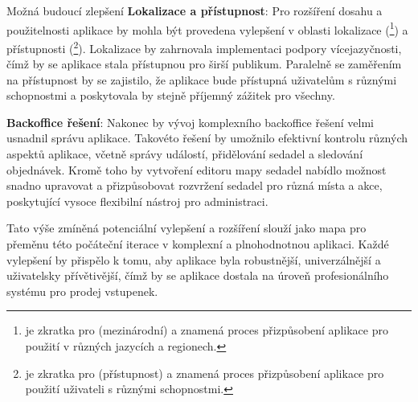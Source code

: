 \begin{section}{Možná budoucí zlepšení}
    \textbf{Lokalizace a přístupnost}: Pro rozšíření dosahu a použitelnosti aplikace by mohla být provedena vylepšení v oblasti lokalizace (\footnote{ je zkratka pro  (mezinárodní) a znamená proces přizpůsobení aplikace pro použití v různých jazycích a regionech.}) a přístupnosti (\footnote{ je zkratka pro  (přístupnost) a znamená proces přizpůsobení aplikace pro použití uživateli s různými schopnostmi.}).
    Lokalizace by zahrnovala implementaci podpory vícejazyčnosti, čímž by se aplikace stala přístupnou pro širší publikum.
    Paralelně se zaměřením na přístupnost by se zajistilo, že aplikace bude přístupná uživatelům s různými schopnostmi a poskytovala by stejně příjemný zážitek pro všechny.

    \textbf{Backoffice řešení}: Nakonec by vývoj komplexního backoffice řešení velmi usnadnil správu aplikace.
    Takovéto řešení by umožnilo efektivní kontrolu různých aspektů aplikace, včetně správy událostí, přidělování sedadel a sledování objednávek.
    Kromě toho by vytvoření editoru mapy sedadel nabídlo možnost snadno upravovat a přizpůsobovat rozvržení sedadel pro různá místa a akce, poskytující vysoce flexibilní nástroj pro administraci.

    Tato výše zmíněná potenciální vylepšení a rozšíření slouží jako mapa pro přeměnu této počáteční iterace v komplexní a plnohodnotnou aplikaci.
    Každé vylepšení by přispělo k tomu, aby aplikace byla robustnější, univerzálnější a uživatelsky přívětivější, čímž by se aplikace dostala na úroveň profesionálního systému pro prodej vstupenek.
\end{section}

